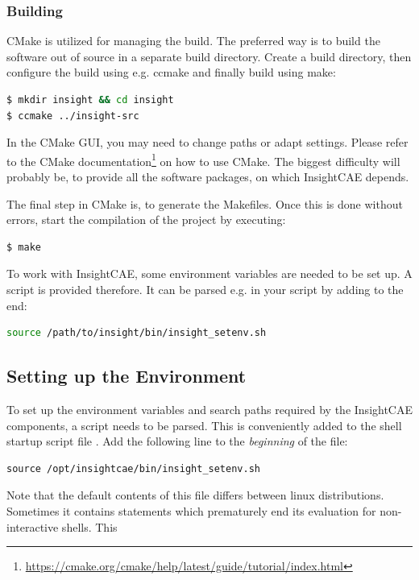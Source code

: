 \subsubsection{Building}


CMake is utilized for managing the build. 
The preferred way is to build the software out of source in a separate build directory. Create a build directory, then configure the build using e.g. ccmake and finally build using make:

\begin{lstlisting}[language=bash]
$ mkdir insight && cd insight
$ ccmake ../insight-src
\end{lstlisting}
In the CMake GUI, you may need to change paths or adapt settings. Please refer to the CMake documentation\footnote{\url{https://cmake.org/cmake/help/latest/guide/tutorial/index.html}} on how to use CMake.
The biggest difficulty will probably be, to provide all the software packages, on which InsightCAE depends.

The final step in CMake is, to generate the Makefiles. Once this is done without errors, start the compilation of the project by executing:

\begin{lstlisting}[language=bash]
$ make
\end{lstlisting}

To work with InsightCAE, some environment variables are needed to be set up. A script is provided therefore. It can be parsed e.g. in your  script by adding to the end:

\begin{lstlisting}[language=bash]
source /path/to/insight/bin/insight_setenv.sh
\end{lstlisting}



\subsection{Setting up the Environment}
\label{sec:setupenvironment}

To set up the environment variables and search paths required by the InsightCAE components, a script needs to be parsed.
This is conveniently added to the shell startup script file .
Add the following line to the \emph{beginning} of the  file:

\begin{lstlisting}
source /opt/insightcae/bin/insight_setenv.sh
\end{lstlisting}

Note that the default contents of this file differs between linux distributions.
Sometimes it contains statements which prematurely end its evaluation for non-interactive shells.
This